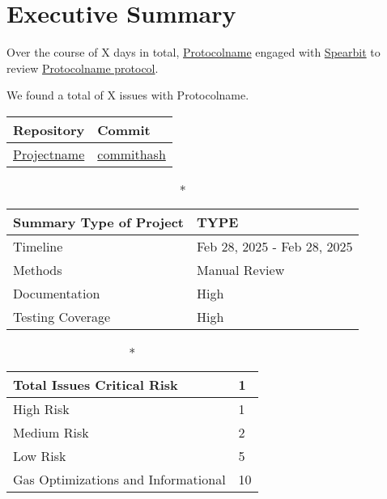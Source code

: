 \hypertarget{executive-summary}{%
\section{Executive Summary}\label{executive-summary}}

Over the course of X days in total, \href{https://protocolname.come}{Protocolname} engaged with
\href{https://spearbit.com}{Spearbit} to review
\href{https://github.com/permalink-to-protocolname}{Protocolname protocol}. 

We found a total of X issues with Protocolname. 

\begin{longtable}[c]{|l|l|}
\hline \textbf{Repository} & \textbf{Commit} \\

\hline
\href{https://github.com/permalink}{Projectname} &
\href{https://github.com/permalink/commit/commithash}{commithash} \\
\hline
\end{longtable}

\begin{longtable}[]{|l|l|}

\caption*{\textbf{Summary}}
\hline Type of Project & TYPE \\   
\hline Timeline & Feb 28, 2025 - Feb 28, 2025   \\
\hline Methods & Manual Review \\
\hline Documentation & High \\
\hline Testing Coverage & High  \\
\hline
\end{longtable}


\begin{longtable}[]{|l|l|}
\caption*{\textbf{Total Issues}}
\hline Critical Risk & 1 \\
\hline High Risk & 1 \\
\hline Medium Risk & 2 \\ 
\hline Low Risk & 5 \\
\hline Gas Optimizations and Informational & 10 \\
\hline
\end{longtable}


